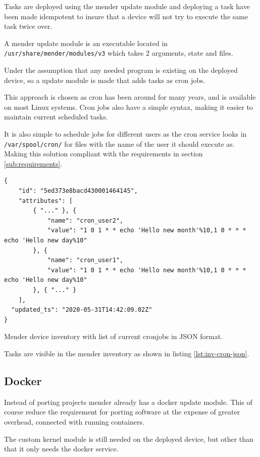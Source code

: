 \documentclass[../../main.tex]{subfiles}
\begin{document}
Tasks are deployed using the mender update module and deploying a task have been made idempotent
to insure that a device will not try to execute the same task twice over.

A mender update module is an executable located in \texttt{/usr/share/mender/modules/v3}
which takes 2 arguments, state and files.

Under the assumption that any needed program is existing on the deployed device,
so a update module is made that adds tasks as cron jobs.

This approach is chosen as cron has been around for many years, and is available on most
Linux systems.
Cron jobs also have a simple syntax, making it easier to maintain current scheduled tasks.

It is also simple to schedule jobs for different users as the cron service looks in
\texttt{/var/spool/cron/} for files with the name of the user it should execute as.
Making this solution compliant with the requirements in section \ref{sub:requirements}.

\begin{listing}[h]
\begin{verbatim}
{
	"id": "5ed373e8bacd430001464145",
	"attributes": [
		{ "..." }, {
			"name": "cron_user2",
			"value": "1 0 1 * * echo 'Hello new month'%10,1 0 * * * echo 'Hello new day%10"
		}, {
			"name": "cron_user1",
			"value": "1 0 1 * * echo 'Hello new month'%10,1 0 * * * echo 'Hello new day%10"
		}, { "..." }
	],
  "updated_ts": "2020-05-31T14:42:09.02Z"
}
\end{verbatim}
\caption{Mender device inventory with list of current cronjobs in JSON format.}
\label{lst:inv-cron-json}
\end{listing}

Tasks are visible in the mender inventory as shown in listing \ref{lst:inv-cron-json}.


\subsection{Docker}%
\label{sub:docker}

Instead of porting projects mender already has a docker update module. This of course reduce
the requirement for porting software at the expense of greater overhead, connected with running
containers.

The custom kernel module is still needed on the deployed device, but other than that it only needs
the docker service.
\end{document}
